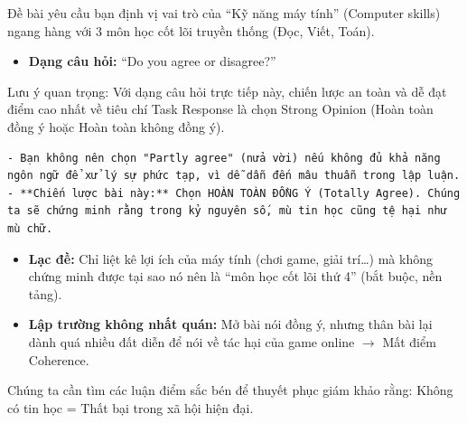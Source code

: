 \vspace{18pt}



Đề bài yêu cầu bạn định vị vai trò của ``Kỹ năng máy tính'' (Computer
skills) ngang hàng với 3 môn học cốt lõi truyền thống (Đọc, Viết, Toán).

\begin{itemize}
\tightlist
\item
  \textbf{Dạng câu hỏi:} ``Do you agree or disagree?''
\end{itemize}

\begin{cdnote}

Lưu ý quan trọng: Với dạng câu hỏi trực tiếp này, chiến lược an toàn và
dễ đạt điểm cao nhất về tiêu chí Task Response là chọn Strong Opinion
(Hoàn toàn đồng ý hoặc Hoàn toàn không đồng ý).

\end{cdnote}

\begin{verbatim}
- Bạn không nên chọn "Partly agree" (nửa vời) nếu không đủ khả năng ngôn ngữ để xử lý sự phức tạp, vì dễ dẫn đến mâu thuẫn trong lập luận.
- **Chiến lược bài này:** Chọn HOÀN TOÀN ĐỒNG Ý (Totally Agree). Chúng ta sẽ chứng minh rằng trong kỷ nguyên số, mù tin học cũng tệ hại như mù chữ.
\end{verbatim}


\begin{itemize}
\tightlist
\item
  \textbf{Lạc đề:} Chỉ liệt kê lợi ích của máy tính (chơi game, giải
  trí\ldots) mà không chứng minh được tại sao nó nên là ``môn học cốt
  lõi thứ 4'' (bắt buộc, nền tảng).
\item
  \textbf{Lập trường không nhất quán:} Mở bài nói đồng ý, nhưng thân bài
  lại dành quá nhiều đất diễn để nói về tác hại của game online
  \(\rightarrow\) Mất điểm Coherence.
\end{itemize}


Chúng ta cần tìm các luận điểm sắc bén để thuyết phục giám khảo rằng:
Không có tin học = Thất bại trong xã hội hiện đại.

